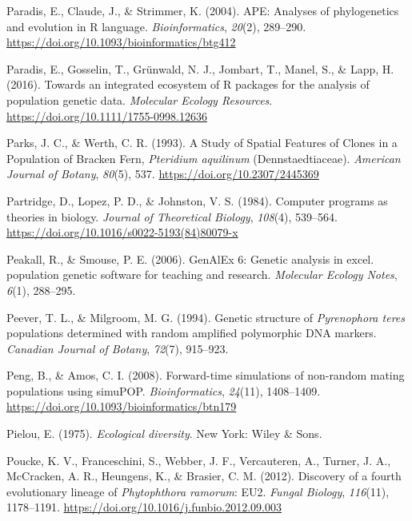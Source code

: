 \documentclass[double,11pt]{beavtex}
\begin{document}
  \hypertarget{ref-paradis2004ape}{}
  Paradis, E., Claude, J., \& Strimmer, K. (2004). APE: Analyses of
  phylogenetics and evolution in R language. \emph{Bioinformatics},
  \emph{20}(2), 289--290.
  \url{https://doi.org/10.1093/bioinformatics/btg412}
  
  \hypertarget{ref-paradis2016towards}{}
  Paradis, E., Gosselin, T., Grünwald, N. J., Jombart, T., Manel, S., \&
  Lapp, H. (2016). Towards an integrated ecosystem of R packages for the
  analysis of population genetic data. \emph{Molecular Ecology Resources}.
  \url{https://doi.org/10.1111/1755-0998.12636}
  
  \hypertarget{ref-parks1993study}{}
  Parks, J. C., \& Werth, C. R. (1993). A Study of Spatial Features of
  Clones in a Population of Bracken Fern, \emph{Pteridium aquilinum}
  (Dennstaedtiaceae). \emph{American Journal of Botany}, \emph{80}(5),
  537. \url{https://doi.org/10.2307/2445369}
  
  \hypertarget{ref-partridge1984computer}{}
  Partridge, D., Lopez, P. D., \& Johnston, V. S. (1984). Computer
  programs as theories in biology. \emph{Journal of Theoretical Biology},
  \emph{108}(4), 539--564.
  \url{https://doi.org/10.1016/s0022-5193(84)80079-x}
  
  \hypertarget{ref-Peakall:2006}{}
  Peakall, R., \& Smouse, P. E. (2006). GenAlEx 6: Genetic analysis in
  excel. population genetic software for teaching and research.
  \emph{Molecular Ecology Notes}, \emph{6}(1), 288--295.
  
  \hypertarget{ref-peever1994genetic}{}
  Peever, T. L., \& Milgroom, M. G. (1994). Genetic structure of
  \emph{Pyrenophora teres} populations determined with random amplified
  polymorphic DNA markers. \emph{Canadian Journal of Botany},
  \emph{72}(7), 915--923.
  
  \hypertarget{ref-peng2008forward}{}
  Peng, B., \& Amos, C. I. (2008). Forward-time simulations of non-random
  mating populations using simuPOP. \emph{Bioinformatics}, \emph{24}(11),
  1408--1409. \url{https://doi.org/10.1093/bioinformatics/btn179}
  
  \hypertarget{ref-pielou1975ecological}{}
  Pielou, E. (1975). \emph{Ecological diversity}. New York: Wiley \& Sons.
  
  \hypertarget{ref-vanpoucke2012discovery}{}
  Poucke, K. V., Franceschini, S., Webber, J. F., Vercauteren, A., Turner,
  J. A., McCracken, A. R., Heungens, K., \& Brasier, C. M. (2012).
  Discovery of a fourth evolutionary lineage of \emph{Phytophthora
  ramorum}: EU2. \emph{Fungal Biology}, \emph{116}(11), 1178--1191.
  \url{https://doi.org/10.1016/j.funbio.2012.09.003}
  
\end{document}
